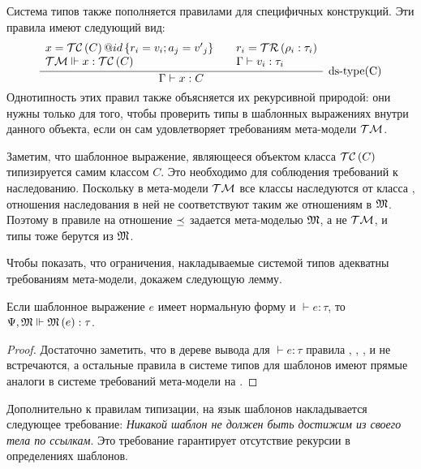 
Система типов также пополняется правилами для специфичных конструкций. Эти правила имеют следующий вид:
$$
\myinfer[\mbox{ds-type(C)}]{
	\Gamma \vdash x : C
}{
	\begin{array}{l}
	x = \obj{\TC{C}}{id}{r_i = v_i; a_j = {v'}_j}\\
	\TM \Vdash x : \TC{C} 
	\end{array}	
	&
	\begin{array}{l}
	r_i = \TR{\rho_i : \tau_i}\\
	\Gamma \vdash v_i : \tau_i\\
	\end{array}	
}
$$ 
Однотипность этих правил также объясняется их рекурсивной природой: они нужны только для того, чтобы проверить типы в шаблонных выражениях внутри данного объекта, если он сам удовлетворяет требованиям мета-модели $\mathcal{TM}$.

Заметим, что шаблонное выражение, являющееся объектом класса $\mathcal{TC}\left(C\right)$ типизируется самим классом $C$. Это необходимо для соблюдения требований к наследованию. Поскольку в мета-модели $\mathcal{TM}$ все классы наследуются от класса , отношения наследования в ней не соответствуют таким же отношениям в $\mathfrak{M}$. Поэтому в правиле  на  отношение $\preceq$ задается мета-моделью $\mathfrak{M}$, а не $\mathcal{TM}$, и типы тоже берутся из $\mathfrak{M}$. 

Чтобы показать, что ограничения, накладываемые системой типов адекватны требованиям мета-модели, докажем следующую лемму.
\begin{Lemm}\label{LemmNF}
Если шаблонное выражение $e$ имеет нормальную форму и $\vdash e : \tau$, то $\Psi, \mathfrak{M} \Vdash \mathfrak{M}\left(e\right) : \tau$.
\end{Lemm}
\begin{proof}
Достаточно заметить, что в дереве вывода для $\vdash e : \tau$ правила , , ,  и  не встречаются, а остальные правила в системе типов для шаблонов имеют прямые аналоги в системе требований мета-модели на .
\end{proof}

Дополнительно к правилам типизации, на язык шаблонов накладывается следующее требование: 
\emph{Никакой шаблон не должен быть достижим из своего тела по ссылкам}. Это требование гарантирует отсутствие рекурсии в определениях шаблонов.

